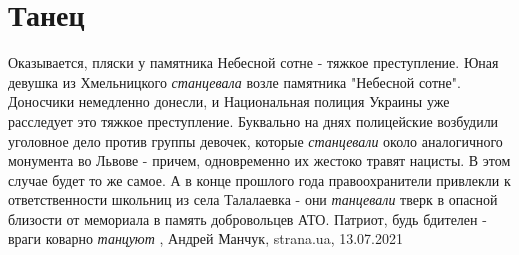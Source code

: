  
 
 
 
 
\chapter{Танец}

Оказывается, пляски у памятника Небесной сотне - тяжкое преступление.  Юная
девушка из Хмельницкого \emph{станцевала} возле памятника "Небесной сотне".  Доносчики
немедленно донесли, и Национальная полиция Украины уже расследует это тяжкое
преступление.  Буквально на днях полицейские возбудили уголовное дело против
группы девочек, которые \emph{станцевали} около аналогичного монумента во Львове -
причем, одновременно их жестоко травят нацисты. В этом случае будет то же
самое.  А в конце прошлого года правоохранители привлекли к ответственности
школьниц из села Талалаевка - они \emph{танцевали} тверк в опасной близости от
мемориала в память добровольцев АТО. Патриот, будь бдителен - враги коварно
\emph{танцуют}
, Андрей Манчук, strana.ua, 13.07.2021

